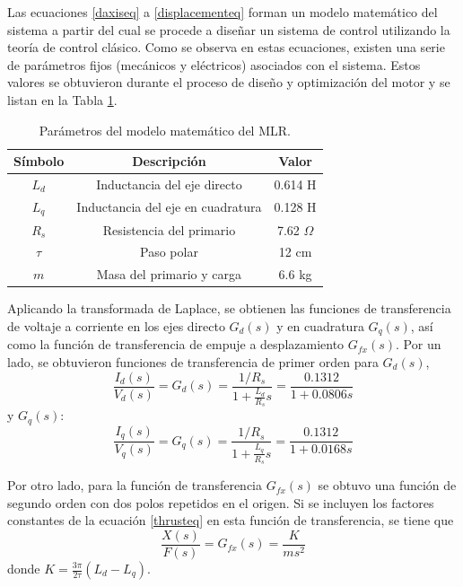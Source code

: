 Las ecuaciones \ref{daxiseq} a \ref{displacementeq} forman un modelo matemático del sistema a partir del cual se procede a diseñar un sistema de control utilizando la teoría de control clásico. Como se observa en estas ecuaciones, existen una serie de parámetros fijos (mecánicos y eléctricos) asociados con el sistema. Estos valores se obtuvieron durante el proceso de diseño y optimización del motor y se listan en la Tabla \ref{table:mlrparams}.

\begin{table}[t]
\centering
\caption{Parámetros del modelo matemático del MLR.}
\label{table:mlrparams}
\begin{tabular}{c c c}\hline
Símbolo & Descripción & Valor\\
\hline\hline
$L_d$ & Inductancia del eje directo & 0.614 H\\
$L_q$ & Inductancia del eje en cuadratura & 0.128 H\\
$R_s$ & Resistencia del primario & 7.62 $\Omega$\\
$\tau$ & Paso polar & 12 cm\\
$m$ & Masa del primario y carga & 6.6 kg
\end{tabular}
\end{table}

Aplicando la transformada de Laplace, se obtienen las funciones de transferencia de voltaje a corriente en los ejes directo $G_d(s)$ y en cuadratura $G_q(s)$, así como la función de transferencia de empuje a desplazamiento $G_{fx}(s)$. Por un lado, se obtuvieron funciones de transferencia de primer orden para $G_d(s)$,
\begin{equation*}
\frac{I_d(s)}{V_d(s)} = G_d(s) = \frac{1/R_s}{1+\frac{L_d}{R_s}s} =
\frac{0.1312}{1+0.0806s}
\end{equation*}
y $G_q(s)$:
\begin{equation*}
\frac{I_q(s)}{V_q(s)} = G_q(s) = \frac{1/R_s}{1+\frac{L_q}{R_s}s} =
\frac{0.1312}{1+0.0168s}
\end{equation*}

Por otro lado, para la función de transferencia $G_{fx}(s)$ se obtuvo una función de segundo orden con dos polos repetidos en el origen. Si se incluyen los factores constantes de la ecuación \ref{thrusteq} en esta función de transferencia, se tiene que
\begin{equation}
\frac{X(s)}{F(s)} = G_{fx}(s) = \frac{K}{ms^2}
\end{equation}
donde $K = \frac{3\pi}{2\tau}(L_d - L_q)$.

